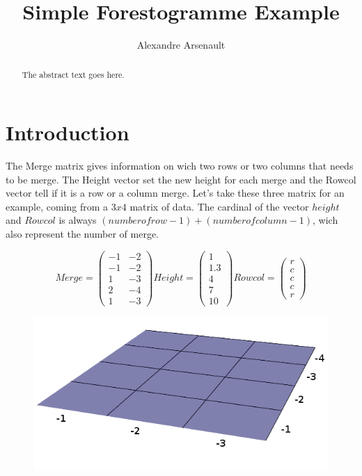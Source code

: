 \documentclass{article}
\begin{document}
\title{Simple Forestogramme Example}
\author{Alexandre Arsenault}

\maketitle

\begin{abstract}
The abstract text goes here.
\end{abstract}

\section{Introduction}
The Merge matrix gives information on wich two rows or two columns that needs to be merge. The Height vector set the new height for each merge and the Rowcol vector tell if it is a row or a column merge. Let's take these three matrix for an example, coming from a $3x4$ matrix of data. The cardinal of the vector $height$ and $Rowcol$ is always $(number of row - 1) + (number of column - 1)$, wich also represent the number of merge.

\begin{figure}[h]

\[
Merge =  \left(\begin{array}{cc}
-1 & -2 \\
-1 & -2 \\
 1 & -3 \\
 2 & -4 \\ 
 1 & -3 
\end{array} \right)
%
Height = \left( \begin{array}{c}
1 \\
1.3 \\
4 \\
7 \\
10 
\end{array} \right)
%
Rowcol = \left( \begin{array}{c}
r \\
c \\
c \\
c \\
r 
\end{array} \right)
\]  
\end{figure}

\begin{figure}[h]

\centering \includegraphics[scale=0.3]{base}
\end{figure}
\end{document}
